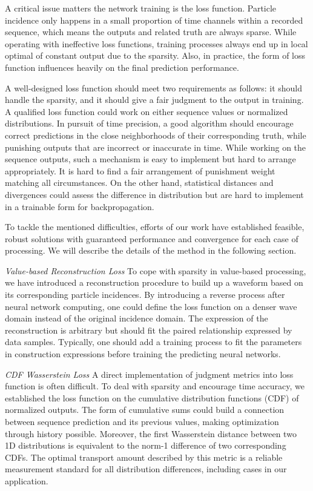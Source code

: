 
A critical issue matters the network training is the loss function. Particle incidence only happens in a small proportion of time channels within a recorded sequence, which means the outputs and related truth are always sparse. While operating with ineffective loss functions, training processes always end up in local optimal of constant output due to the sparsity. Also, in practice, the form of loss function influences heavily on the final prediction performance. 

A well-designed loss function should meet two requirements as follows: it should handle the sparsity, and it should give a fair judgment to the output in training. A qualified loss function could work on either sequence values or normalized distributions. In pursuit of time precision, a good algorithm should encourage correct predictions in the close neighborhoods of their corresponding truth, while punishing outputs that are incorrect or inaccurate in time. While working on the sequence outputs, such a mechanism is easy to implement but hard to arrange appropriately. It is hard to find a fair arrangement of punishment weight matching all circumstances. On the other hand, statistical distances and divergences could assess the difference in distribution but are hard to implement in a trainable form for backpropagation. 

To tackle the mentioned difficulties, efforts of our work have established feasible, robust solutions with guaranteed performance and convergence for each case of processing. We will describe the details of the method in the following section.

\emph{Value-based Reconstruction Loss}
To cope with sparsity in value-based processing, we have introduced a reconstruction procedure to build up a waveform based on its corresponding particle incidences. By introducing a reverse process after neural network computing, one could define the loss function on a denser wave domain instead of the original incidence domain. The expression of the reconstruction is arbitrary but should fit the paired relationship expressed by data samples. Typically, one should add a training process to fit the parameters in construction expressions before training the predicting neural networks.

\emph{CDF Wasserstein Loss}
A direct implementation of judgment metrics into loss function is often difficult. To deal with sparsity and encourage time accuracy, we established the loss function on the cumulative distribution functions (CDF) of normalized outputs. The form of cumulative sums could build a connection between sequence prediction and its previous values, making optimization through history possible. Moreover, the first Wasserstein distance between two 1D distributions is equivalent to the norm-1 difference of two corresponding CDFs. The optimal transport amount described by this metric is a reliable measurement standard for all distribution differences, including cases in our application. 

